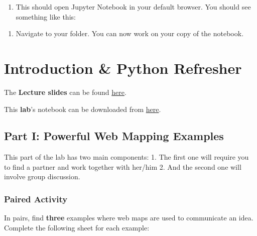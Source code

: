 \documentclass[
  letterpaper,
  DIV=11,
  numbers=noendperiod]{scrreprt}
\providecommand{\tightlist}{%
  \setlength{\itemsep}{0pt}\setlength{\parskip}{0pt}}\usepackage{longtable,booktabs,array}
\begin{document}
\begin{enumerate}
\def\labelenumi{\arabic{enumi}.}
\setcounter{enumi}{5}
\tightlist
\item
  This should open Jupyter Notebook in your default browser. You should
  see something like this:
\end{enumerate}

\begin{enumerate}
\def\labelenumi{\arabic{enumi}.}
\setcounter{enumi}{6}
\tightlist
\item
  Navigate to your folder. You can now work on your copy of the
  notebook.
\end{enumerate}


\hypertarget{introduction-python-refresher}{%
\chapter{Introduction \& Python
Refresher}\label{introduction-python-refresher}}

The \textbf{Lecture slides} can be found
\href{https://slides.com/gfilo/web-mapping-and-geovisualisation-envs456/fullscreen}{here}.

This \textbf{lab}'s notebook can be downloaded from
\href{https://github.com/GDSL-UL/wma/blob/main/labs/w01_intro.ipynb}{here}.

\hypertarget{part-i-powerful-web-mapping-examples}{%
\section{Part I: Powerful Web Mapping
Examples}\label{part-i-powerful-web-mapping-examples}}

This part of the lab has two main components: 1. The first one will
require you to find a partner and work together with her/him 2. And the
second one will involve group discussion.

\hypertarget{paired-activity}{%
\subsection{Paired Activity}\label{paired-activity}}

In pairs, find \textbf{three} examples where web maps are used to
communicate an idea. Complete the following sheet for each example:
\end{document}
